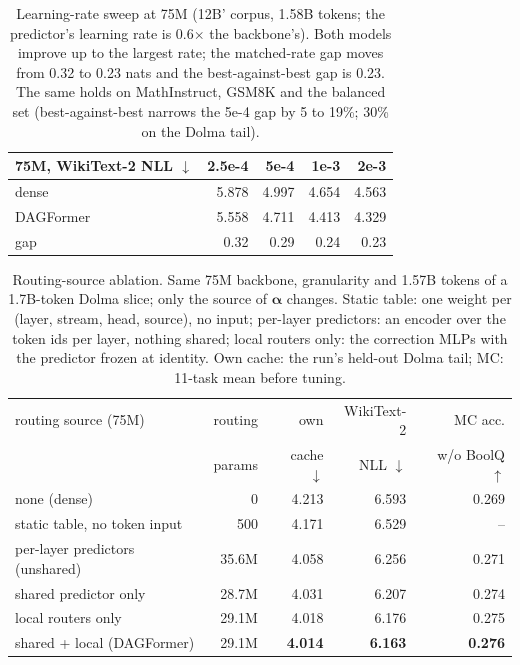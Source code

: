 \documentclass[11pt]{article}
\newcommand{\dagf}{DAGFormer}
\newcommand{\valpha}{\boldsymbol{\alpha}}
\begin{document}
\begin{table}[t]
\centering\footnotesize
\setlength{\tabcolsep}{3pt}
\begin{tabular}{lrrrr}
\toprule
75M, WikiText-2 NLL $\downarrow$ & 2.5e-4 & 5e-4 & 1e-3 & 2e-3 \\
\midrule
dense & 5.878 & 4.997 & 4.654 & 4.563 \\
\dagf{} & 5.558 & 4.711 & 4.413 & 4.329 \\
gap & 0.32 & 0.29 & 0.24 & 0.23 \\
\bottomrule
\end{tabular}
\caption{Learning-rate sweep at 75M (12B' corpus, 1.58B tokens; the predictor's learning rate is 0.6$\times$ the backbone's). Both models improve up to the largest rate; the matched-rate gap moves from 0.32 to 0.23 nats and the best-against-best gap is 0.23. The same holds on MathInstruct, GSM8K and the balanced set (best-against-best narrows the 5e-4 gap by 5 to 19\%; 30\% on the Dolma tail).}
\label{tab:lrsweep}
\end{table}

\begin{table}[h]
\centering\scriptsize
\setlength{\tabcolsep}{2pt}
\begin{tabular}{lrrrr}
\toprule
routing source (75M) & routing & own & WikiText-2 & MC acc. \\
 & params & cache $\downarrow$ & NLL $\downarrow$ & w/o BoolQ $\uparrow$ \\
\midrule
none (dense) & 0 & 4.213 & 6.593 & 0.269 \\
static table, no token input & 500 & 4.171 & 6.529 & -- \\
per-layer predictors (unshared) & 35.6M & 4.058 & 6.256 & 0.271 \\
shared predictor only & 28.7M & 4.031 & 6.207 & 0.274 \\
local routers only & 29.1M & 4.018 & 6.176 & 0.275 \\
shared + local (\dagf{}) & 29.1M & \textbf{4.014} & \textbf{6.163} & \textbf{0.276} \\
\bottomrule
\end{tabular}
\caption{Routing-source ablation. Same 75M backbone, granularity and 1.57B tokens of a 1.7B-token Dolma slice; only the source of $\valpha$ changes. Static table: one weight per (layer, stream, head, source), no input; per-layer predictors: an encoder over the token ids per layer, nothing shared; local routers only: the correction MLPs with the predictor frozen at identity. Own cache: the run's held-out Dolma tail; MC: 11-task mean before tuning.}
\label{tab:locality}
\end{table}
\end{document}

